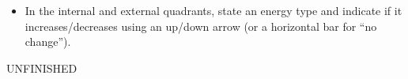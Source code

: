 \documentclass[12pt]{article}
\begin{document}
\begin{itemize}
\begin{itemize}
	\item In the internal and external quadrants, state an energy type and indicate if it increases/decreases using an up/down arrow (or a horizontal bar for ``no change'').
		\end{itemize}
	UNFINISHED
	\end{itemize}




\end{document}
